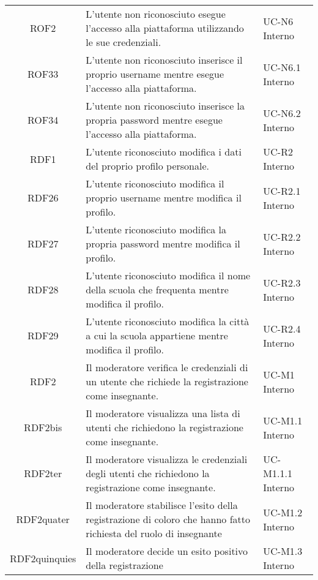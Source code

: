 \begin{tabularx}{\textwidth}{| c | p{10cm} | X |}
		ROF2 & L'utente non riconosciuto esegue l'accesso alla piattaforma utilizzando le sue credenziali. & UC-N6 \newline Interno\\
		ROF33 & L'utente non riconosciuto inserisce il proprio username mentre esegue l'accesso alla piattaforma. & UC-N6.1 \newline Interno\\
		ROF34 & L'utente non riconosciuto inserisce la propria password mentre esegue l'accesso alla piattaforma. & UC-N6.2 \newline Interno\\
		RDF1 & L'utente riconosciuto modifica i dati del proprio profilo personale. & UC-R2 \newline Interno\\
		RDF26 & L'utente riconosciuto modifica il proprio username mentre modifica il profilo. & UC-R2.1 \newline Interno\\
		RDF27 & L'utente riconosciuto modifica la propria password mentre modifica il profilo. & UC-R2.2 \newline Interno\\
		RDF28 & L'utente riconosciuto modifica il nome della scuola che frequenta mentre modifica il profilo. & UC-R2.3 \newline Interno\\
		RDF29 & L'utente riconosciuto modifica la città a cui la scuola appartiene mentre modifica il profilo. & UC-R2.4 \newline Interno\\
		RDF2 & Il moderatore verifica le credenziali di un utente che richiede la registrazione come insegnante. & UC-M1 \newline Interno\\
		RDF2bis & Il moderatore visualizza una lista di utenti che richiedono la registrazione come insegnante. & UC-M1.1 \newline Interno\\
		RDF2ter & Il moderatore visualizza le credenziali degli utenti che richiedono la registrazione come insegnante. & UC-M1.1.1 \newline Interno\\
		RDF2quater & Il moderatore stabilisce l'esito della registrazione di coloro che hanno fatto richiesta del ruolo di insegnante & UC-M1.2 \newline Interno\\
		RDF2quinquies & Il moderatore decide un esito positivo della registrazione & UC-M1.3 \newline Interno\\

\end{tabularx}
